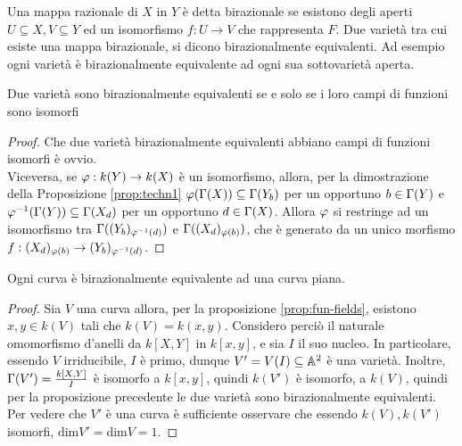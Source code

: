 \begin{comment}
        Sia quindi $g \in \gG(W)$ che si annulla in $Q$, allora $\tilde{F}(g)$ si annulla in $P$, e di conseguenza $f(P) = Q$. \\
        Suppongo ora $X,Y$ affini, allora per ogni omomorfismo $\gvf : k(Y) \to k(X), \gvf(\gG(Y)) \subseteq \gG(X_b)$, per un opportuno $b \in \gG(X)$, allora $\gvf$ è indotta da un morfismo $f : X_b \to Y$, e $f(X_b)$ è denso. \\
        Dimostro la densità di $f(X_b)$: $\gvf$ iniettivo perché estensione di $\tilde{F}$, che è dominante quindi per ogni coppia di funzioni $g,h \in k(Y), g \circ \gvf = h \circ \gvf \Longrightarrow g = h$. Ciò avviene se e solo se 
        l'uguaglianza di $g,h$ su $f(X_b)$ implica l'uguaglianza di $g,h$ per ogni coppia di funzioni, ma questo è vero solo se $X_b$ è denso. 
    \end{proof}
    \end{comment}
    Una mappa razionale di $X$ in $Y$ è detta birazionale se esistono degli aperti $U \subseteq X, V \subseteq Y$ ed un isomorfismo $f : U \to V$ che rappresenta $F$. Due varietà tra cui esiste una mappa birazionale, si dicono birazionalmente equivalenti. Ad esempio ogni 
    varietà è birazionalmente equivalente ad ogni sua sottovarietà aperta. 
    \begin{proposizione}
        Due varietà sono birazionalmente equivalenti se e solo se i loro campi di funzioni sono isomorfi
    \end{proposizione}
    \begin{proof}
        Che due varietà birazionalmente equivalenti abbiano campi di funzioni isomorfi è ovvio. \\
        Viceversa, se $\varphi : k(Y) \to k(X)$ è un isomorfismo, allora, per la dimostrazione della Proposizione \ref{prop:techn1} $\varphi(\Gamma(X)) \subseteq \Gamma(Y_b)$ per un opportuno $b \in \Gamma(Y)$ e $\varphi^{-1}(\Gamma(Y)) \subseteq \Gamma(X_d)$ per un opportuno $d \in \Gamma(X)$. 
        Allora $\varphi$ si restringe ad un isomorfismo tra $\Gamma((Y_b)_{\varphi^{-1}(d)})$ e $\Gamma((X_d)_{\varphi(b)})$, che è generato da un unico morfismo $f : (X_d)_{\varphi(b)} \to (Y_b)_{\varphi^{-1}(d)}$.
    \end{proof}
    \begin{corollario}
        Ogni curva è birazionalmente equivalente ad una curva piana.
    \end{corollario}
    \begin{proof}
        Sia $V$ una curva allora, per la proposizione \ref{prop:fun-fields}, esistono $x,y \in k(V)$ tali che $k(V) = k(x,y)$. Considero perciò il naturale omomorfismo d'anelli da $k[X,Y]$ in $k[x,y]$, e sia $I$ il suo nucleo. In particolare, essendo $V$ irriducibile, $I$ è primo, 
        dunque $V' = V(I) \subseteq \mathbb{A}^2$ è una varietà. Inoltre, $\Gamma(V') = \frac{k[X,Y]}{I}$ è isomorfo a $k[x,y]$, quindi $k(V')$ è isomorfo, a $k(V)$, quindi per la proposizione precedente le due varietà sono birazionalmente equivalenti. Per vedere che $V'$ è una curva è 
        sufficiente osservare che essendo $k(V),k(V')$ isomorfi, $\text{dim}V' = \text{dim}V = 1$.
    \end{proof}
